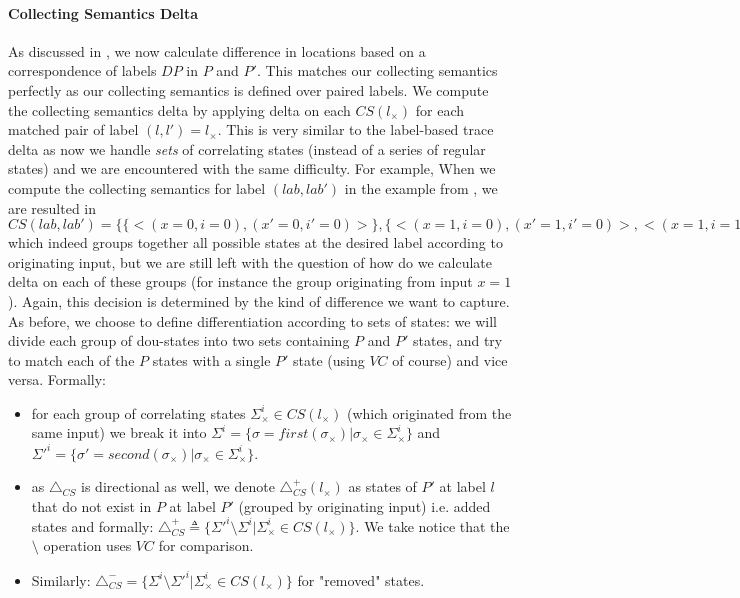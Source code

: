 \paragraph{Collecting Semantics Delta} 
As discussed in , we now calculate difference in locations based on a correspondence of labels $DP$ in $P$ and $P'$. This matches our collecting semantics perfectly as our collecting semantics is defined over paired labels. We compute the collecting semantics delta by applying delta on each $CS(l_{\times})$ for each matched pair of label $(l,l') = l_{\times}$. This is very similar to the label-based trace delta as now we handle \emph{sets} of correlating states (instead of a series of regular states) and we are encountered with the same difficulty. For example, When we compute the collecting semantics for label $(lab,lab')$ in the example from , we are resulted in $CS(lab,lab') = \{ \{ <(x=0,i=0),(x'=0,i'=0)> \}, \{ <(x=1,i=0),(x'=1,i'=0)>, <(x=1,i=1),(x'=1,i'=0)>, <(x=1,i=0),(x'=1,i'=1)>, <(x=1,i=1),(x'=1,i'=1)>, <(x=1,i=0),(x'=1,i'=2)>, <(x=1,i=1),(x'=1,i'=2)> \}, ... \}$ which indeed groups together all possible states at the desired label according to originating input, but we are still left with the question of how do we calculate delta on each of these groups (for instance the group originating from input $x=1$). Again, this decision is determined by the kind of difference we want to capture. As before, we choose to define differentiation according to sets of states: we will divide each group of dou-states into two sets containing $P$ and $P'$ states, and try to match each of the $P$ states with a single $P'$ state (using $VC$ of course) and vice versa. Formally:
\begin{itemize}
\item for each group of correlating states $\Sigma_{\times}^{i} \in CS(l_{\times})$ (which originated from the same input) we break it into  $\Sigma^{i} = \{\sigma = first(\sigma_{\times}) |  \sigma_{\times} \in \Sigma_{\times}^{i}\}$ and $\Sigma'^{i} = \{\sigma' = second(\sigma_{\times}) |  \sigma_{\times} \in \Sigma_{\times}^{i}\}$.
\item as $\triangle_{CS}$ is directional as well, we denote $\triangle_{CS}^{+}(l_{\times})$ as states of $P'$ at label $l$ that do not exist in $P$ at label $P'$ (grouped by originating input) i.e. added states and formally: $\triangle_{CS}^{+} \triangleq \{ \Sigma'^{i} \setminus \Sigma^{i} | \Sigma_{\times}^{i} \in CS(l_{\times}) \}$. We take notice that the $\setminus$ operation uses $VC$ for comparison.
\item Similarly: $\triangle_{CS}^{-} = \{ \Sigma^{i} \setminus \Sigma'^{i} | \Sigma_{\times}^{i} \in CS(l_{\times}) \}$ for "removed" states.
\end{itemize}

